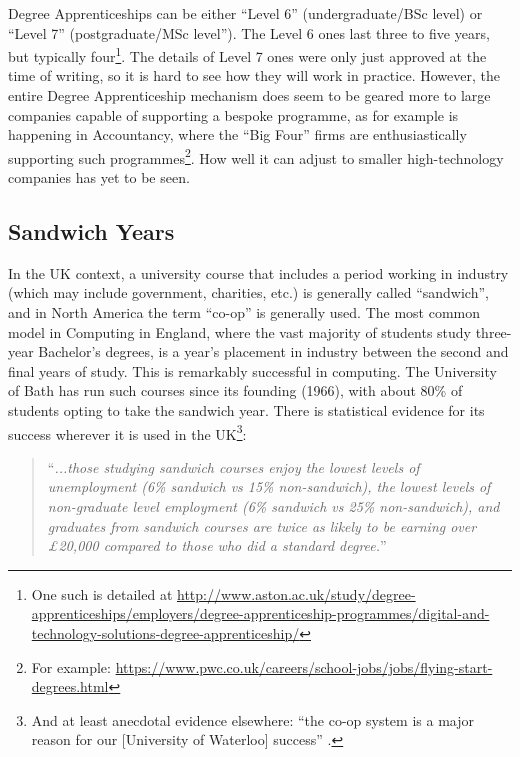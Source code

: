 \documentclass[conference]{IEEEtran}
\begin{document}
Degree Apprenticeships can be either ``Level 6'' (undergraduate/BSc
level) or ``Level 7'' (postgraduate/MSc level''). The Level 6 ones
last three to five years, but typically four\footnote{One such is detailed at
\url{http://www.aston.ac.uk/study/degree-apprenticeships/employers/degree-apprenticeship-programmes/digital-and-technology-solutions-degree-apprenticeship/}}. The
details of Level 7 ones \cite{IfA2018a} were only just approved at the
time of writing, so it is hard to see how they will work in
practice. However, the entire Degree Apprenticeship mechanism does
seem to be geared more to large companies capable of supporting a
bespoke programme, as for example is happening in Accountancy, where
the ``Big Four'' firms are enthusiastically supporting such
programmes\footnote{For example:
\url{https://www.pwc.co.uk/careers/school-jobs/jobs/flying-start-degrees.html}}. How
well it can adjust to smaller high-technology companies has yet to be
seen.

\subsection{Sandwich Years}

In the UK context, a university course that includes a period
working in industry (which may include government, charities, etc.) is
generally called ``sandwich'', and in North America the term ``co-op''
is generally used. The most common model in Computing in England,
where the vast majority of students study three-year Bachelor's
degrees, is a year's placement in industry between the second and
final years of study. This is remarkably successful in computing. The
University of Bath has run such courses since its founding (1966),
with about 80\% of students opting to take the sandwich year. There is
statistical evidence for its success wherever it is used in the
UK\footnote{And at least anecdotal evidence elsewhere: ``the co-op
system is a major reason for our [University of Waterloo] success''
\cite{Watt2017a}.}:

\begin{quote} ``{\emph{...those studying sandwich courses enjoy the lowest levels
of unemployment (6\% sandwich vs 15\% non-sandwich), the lowest levels
of non-graduate level employment (6\% sandwich vs 25\% non-sandwich),
and graduates from sandwich courses are twice as likely to be earning
over \pounds20,000 compared to those who did a standard
degree.}}''~\cite{Shadbolt2016a}
\end{quote}
\end{document}
